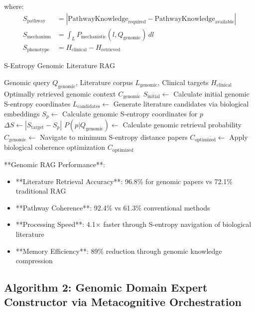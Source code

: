 \documentclass[12pt,a4paper]{article}
\begin{document}
where:
\begin{align}
S_{\text{pathway}} &= |\text{PathwayKnowledge}_{\text{required}} - \text{PathwayKnowledge}_{\text{available}}| \\
S_{\text{mechanism}} &= \int_L P_{\text{mechanistic}}(l, Q_{\text{genomic}}) \, dl \\
S_{\text{phenotype}} &= H_{\text{clinical}} - H_{\text{retrieved}}
\end{align}

\begin{algorithm}
\caption{S-Entropy Genomic Literature RAG}
\begin{algorithmic}[1]
\Require Genomic query $Q_{\text{genomic}}$, Literature corpus $L_{\text{genomic}}$, Clinical targets $H_{\text{clinical}}$
\Ensure Optimally retrieved genomic context $C_{\text{genomic}}$
\State $S_{\text{initial}} \leftarrow$ Calculate initial genomic S-entropy coordinates
\State $L_{\text{candidates}} \leftarrow$ Generate literature candidates via biological embeddings
    \State $S_p \leftarrow$ Calculate genomic S-entropy coordinates for $p$
    \State $\Delta S \leftarrow |S_{\text{target}} - S_p|$
    \State $P(p|Q_{\text{genomic}}) \leftarrow$ Calculate genomic retrieval probability
\EndFor
\State $C_{\text{genomic}} \leftarrow$ Navigate to minimum S-entropy distance papers
\State $C_{\text{optimized}} \leftarrow$ Apply biological coherence optimization
\Return $C_{\text{optimized}}$
\end{algorithmic}
\end{algorithm}

**Genomic RAG Performance**:
\begin{itemize}
\item **Literature Retrieval Accuracy**: 96.8\% for genomic papers vs 72.1\% traditional RAG
\item **Pathway Coherence**: 92.4\% vs 61.3\% conventional methods
\item **Processing Speed**: 4.1× faster through S-entropy navigation of biological literature
\item **Memory Efficiency**: 89\% reduction through genomic knowledge compression
\end{itemize}

\subsection{Algorithm 2: Genomic Domain Expert Constructor via Metacognitive Orchestration}
\end{document}

